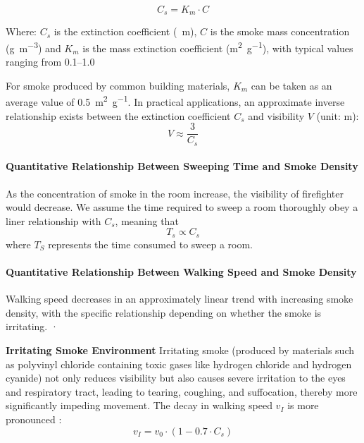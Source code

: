 \begin{equation}
C_s = K_m \cdot C
\label{eq:conversion}
\end{equation}

Where:
\( C_s \) is the extinction coefficient (\si{\per\meter}),
\( C \) is the smoke mass concentration (\si{\gram\per\cubic\meter})
and \( K_m \) is the mass extinction coefficient (\si{\square\meter\per\gram}), with typical values ranging from \numrange{0.1}{1.0}

For smoke produced by common building materials, \( K_m \) can be taken as an average value of \SI{0.5}{\square\meter\per\gram}. In practical applications, an approximate inverse relationship exists between the extinction coefficient \( C_s \) and visibility \( V \) (unit: \si{\meter}):
\begin{equation}
V \approx \frac{3}{C_s}
\label{eq:visibility}
\end{equation}







\paragraph{Quantitative Relationship Between Sweeping Time and Smoke Density}

As the concentration of smoke in the room increase, the visibility of firefighter would decrease. We assume the time required to sweep a room thoroughly obey a liner relationship with $C_s$, meaning that $$T_s \propto C_s $$ where $T_S$ represents the time consumed to sweep a room.

\paragraph{Quantitative Relationship Between Walking Speed and Smoke Density}

Walking speed decreases in an approximately linear trend with increasing smoke density, with the specific relationship depending on whether the smoke is irritating.
· 

\textbf{Irritating Smoke Environment}
Irritating smoke (produced by materials such as polyvinyl chloride containing toxic gases like hydrogen chloride and hydrogen cyanide) not only reduces visibility but also causes severe irritation to the eyes and respiratory tract, leading to tearing, coughing, and suffocation, thereby more significantly impeding movement. The decay in walking speed \( v_I \) is more pronounced \cite{Jin1978, GB31593.9}:
\begin{equation}
v_I = v_0 \cdot (1 - 0.7 \cdot C_s)
\label{eq:irritant}
\end{equation}

